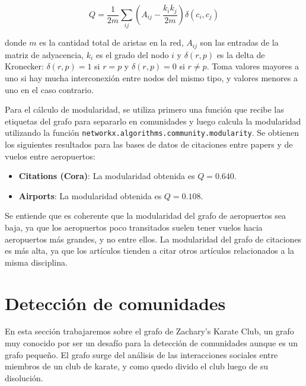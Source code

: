 \documentclass{article}
\begin{document}
\begin{equation}
    \label{eq: modularity}
    Q = \frac{1}{2m} \sum_{ij} \left(A_{ij} -\frac{k_ik_j}{2m} \right)\delta(c_i,c_j)
\end{equation}

donde $m$ es la cantidad total de aristas en la red, $A_{ij}$ son las entradas de la matriz de adyacencia, $k_i$ es el grado del nodo $i$ y $\delta(r,p)$ es la delta de Kronecker: $\delta(r,p) = 1$ si $r=p$ y $\delta(r,p) = 0$ si $r\neq p$. Toma valores mayores a uno si hay mucha interconexión entre nodos del mismo tipo, y valores menores a uno en el caso contrario.


Para el cálculo de modularidad, se utiliza primero una función que recibe las etiquetas del grafo para separarlo en comunidades y luego calcula la modularidad utilizando la función \verb|networkx.algorithms.community.modularity|. Se obtienen los siguientes resultados para las bases de datos de citaciones entre papers y de vuelos entre aeropuertos:
\begin{itemize}
    \item \textbf{Citations (Cora)}: La modularidad obtenida es $Q = 0.640$.
    \item \textbf{Airports}: La modularidad obtenida es $Q = 0.108$.
\end{itemize}

Se entiende que es coherente que la modularidad del grafo de aeropuertos sea baja, ya que los aeropuertos poco transitados suelen tener vuelos hacia aeropuertos más grandes, y no entre ellos. La modularidad del grafo de citaciones es más alta, ya que los artículos tienden a citar otros artículos relacionados a la misma disciplina.

\section{Detección de comunidades} \label{sec: comunidades}

En esta sección trabajaremos sobre el grafo de Zachary's Karate Club, un grafo muy conocido por ser un desafío para la detección de comunidades aunque es un grafo pequeño. El grafo surge del análisis de las interacciones sociales entre miembros de un club de karate, y como quedo divido  el club luego de su disolución.
\end{document}

